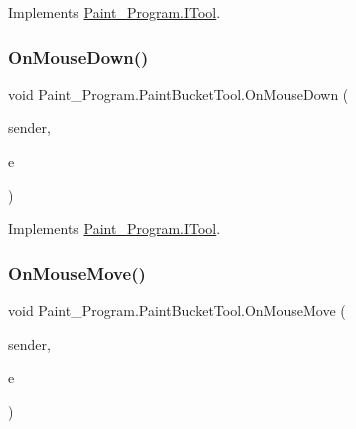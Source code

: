 Implements \mbox{\hyperlink{interface_paint___program_1_1_i_tool_a951b844bcbf47a6c306104fa86be7a5d}{Paint\+\_\+\+Program.\+I\+Tool}}.

\mbox{\label{class_paint___program_1_1_paint_bucket_tool_a468286c5eb5f2a49fe92387b9c859398}} 
\subsubsection{\texorpdfstring{On\+Mouse\+Down()}{OnMouseDown()}}
{\footnotesize\ttfamily void Paint\+\_\+\+Program.\+Paint\+Bucket\+Tool.\+On\+Mouse\+Down (\begin{DoxyParamCaption}\item[{object}]{sender,  }\item[{Mouse\+Event\+Args}]{e }\end{DoxyParamCaption})\hspace{0.3cm}{\ttfamily [inline]}}



Implements \mbox{\hyperlink{interface_paint___program_1_1_i_tool_a73d8797f4f2b1e0d8efe8aadcd44e840}{Paint\+\_\+\+Program.\+I\+Tool}}.

\mbox{\label{class_paint___program_1_1_paint_bucket_tool_a0a4dfeb323d746b531ece7d4a9e218a7}} 
\subsubsection{\texorpdfstring{On\+Mouse\+Move()}{OnMouseMove()}}
{\footnotesize\ttfamily void Paint\+\_\+\+Program.\+Paint\+Bucket\+Tool.\+On\+Mouse\+Move (\begin{DoxyParamCaption}\item[{object}]{sender,  }\item[{Mouse\+Event\+Args}]{e }\end{DoxyParamCaption})\hspace{0.3cm}{\ttfamily [inline]}}



